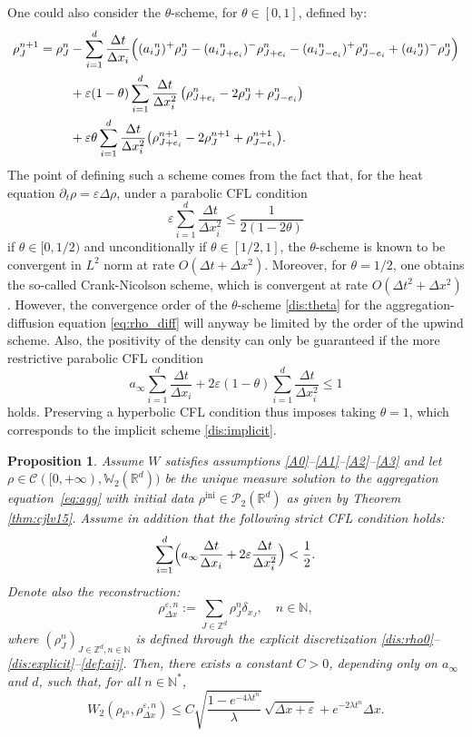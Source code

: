 \documentclass[JEP,XML,SOM,Unicode, NoFloatCountersInSection,published]{cedram}
\newcommand{\ini}{\mathrm{ini}}
\def\NN{\mathbb{N}}
\def\RR{\mathbb{R}}
\def\ZZ{\mathbb{Z}}
\def\WW{\mathbb{W}}
\def\eps{\varepsilon}
\def\pa{\partial}
\def\dt{\Delta t}
\def\dx{\Delta x}
\def\calC{{\mathcal C}}
\def\calP{{\mathcal P}}
\theoremstyle{plain}
\newtheorem{prop}[theorem]{Proposition}
\theoremstyle{definition}
\begin{document}
One could also consider the $\theta$-scheme, for $\theta \in [0,1]$, defined by:
\begin{align}\label{dis:theta}
\rho_{J}^{n+1} = \rho_{J}^n &- \sum_{i=1}^{d} \frac{\dt}{\dx_i}
\Big(({a_i}^n_{J})^+ \rho_{J}^n - ({a_i}^n_{J+e_i})^- \rho_{J+e_i}^n
-({a_i}^n_{J-e_i})^+ \rho_{J-e_i}^n + ({a_i}^n_{J})^- \rho_{J}^n \Big)\notag \\
& + \eps (1-\theta) \sum_{i=1}^{d} \frac{\dt}{\dx_i^2} \left(\rho_{J+e_i}^n - 2\rho_J^n + \rho_{J-e_i}^n \right) \\
& + \eps \theta \sum_{i=1}^{d} \frac{\dt}{\dx_i^2} \bigl(\rho_{J+e_i}^{n+1} - 2\rho_J^{n+1} + \rho_{J-e_i}^{n+1} \bigr).\notag
\end{align}
The point of defining such a scheme comes from the fact that, for the heat equation $\pa_t \rho = \eps \Delta \rho$, under a parabolic CFL condition
\[
\eps \sum_{i=1}^{d} \frac{\dt}{\dx_i^2} \leq \frac{1}{2(1-2\theta)}
\]
if $\theta \in [0, 1/2)$ and unconditionally if $\theta \in [1/2, 1]$, the $\theta$-scheme is known to be convergent in $L^2$ norm at rate $O(\dt + \dx^2)$. Moreover, for $\theta = 1/2$, one obtains the so-called Crank-Nicolson scheme, which is convergent at rate $O(\dt^2 + \dx^2)$.
However, the convergence order of the $\theta$-scheme \eqref{dis:theta} for the aggregation-diffusion equation \eqref{eq:rho_diff} will anyway be limited by the order of the upwind scheme. Also, the positivity of the density can only be guaranteed if the more restrictive parabolic CFL condition
\[
a_\infty \sum_{i=1}^{d} \frac{\dt}{\dx_i} + 2\eps (1-\theta) \sum_{i=1}^{d} \frac{\dt}{\dx_i^2} \leq 1
\]
holds. Preserving a hyperbolic CFL condition thus imposes taking $\theta = 1$, which corresponds to the implicit scheme \eqref{dis:implicit}.

\begin{prop}\label{prop:cvOrder1/2:scheme}
Assume $W$ satisfies assumptions \eqref{A0}--\eqref{A1}--\eqref{A2}--\eqref{A3} and let $\rho \in \calC([0,+\infty), \WW_2(\RR^d))$ be the unique measure solution to the aggregation equation~\eqref{eq:agg} with initial data $\rho^{\ini} \in \calP_2(\RR^d)$ as
given by Theorem \ref{thm:cjlv15}. Assume in addition that the following strict CFL condition holds:
\begin{equation}
\label{CFL}
\sum_{i=1}^d \Bigl(a_\infty \frac{\dt}{\dx_i} + 2\eps \frac{\dt}{\dx_i^2}\Bigr) < \frac 12.
\end{equation}
Denote also the reconstruction:
\[
\rho_{\dx}^{\eps,n} := \sum_{J\in \ZZ^d} \rho_J^n \delta_{x_J},
\quad n \in {\mathbb N},
\]
where $(\rho_J^n)_{J\in \ZZ^d, n \in \mathbb N}$ is defined through the explicit discretization
\eqref{dis:rho0}--\eqref{dis:explicit}--\eqref{def:aij}.
Then, there exists a constant $C>0$, depending only on $a_\infty$ and $d$, such that, for all $n\in \NN^*$,
\begin{equation}
\label{eq:cvOrder1/2:scheme:bound:1}
W_2(\rho_{t^n},\rho_{\dx}^{\eps,n} ) \leq C \sqrt{\frac{1 - e^{-4\lambda t^n}}{\lambda}}\, \sqrt{\dx + \eps} + e^{-2\lambda t^n} \dx.
\end{equation}
\end{prop}
\end{document}
